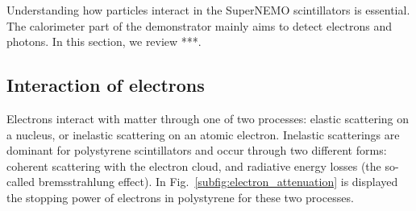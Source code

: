 Understanding how particles interact in the SuperNEMO scintillators is essential.
The calorimeter part of the demonstrator mainly aims to detect electrons and photons.
In this section, we review ***.


\subsection{Interaction of electrons}

Electrons interact with matter through one of two processes: elastic scattering on a nucleus, or inelastic scattering on an atomic electron.
Inelastic scatterings are dominant for polystyrene scintillators and occur through two different forms: coherent scattering with the electron cloud, and radiative energy losses (the so-called bremsstrahlung effect).
In Fig.~\ref{subfig:electron_attenuation} is displayed the stopping power of electrons in polystyrene for these two processes.

